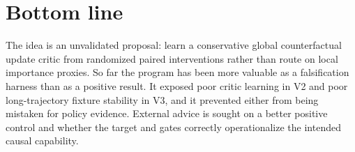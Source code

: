 \documentclass[11pt]{article}
\begin{document}
\section{Bottom line}
The idea is an unvalidated proposal: learn a conservative global counterfactual update critic from randomized paired interventions rather than route on local importance proxies. So far the program has been more valuable as a falsification harness than as a positive result. It exposed poor critic learning in V2 and poor long-trajectory fixture stability in V3, and it prevented either from being mistaken for policy evidence. External advice is sought on a better positive control and whether the target and gates correctly operationalize the intended causal capability.
\end{document}
